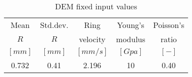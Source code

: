 \begin{table}[h]
\centering
\begin{tabular}{ccccc}
\hline
    Mean & Std.dev. & Ring  & Young's & Poisson's \\
    $R$ & $R$ & velocity & modulus & ratio \\
    $[mm]$  & $[mm]$  & $[mm/s]$ & $[Gpa]$ & $[-]$ \\
    \hline
    0.732 & 0.41  & 2.196 & 10    & 0.40 \\


\hline
\end{tabular}
\caption{DEM fixed input values}
\label{tab:09DEMFixedinputvalues}
\end{table}